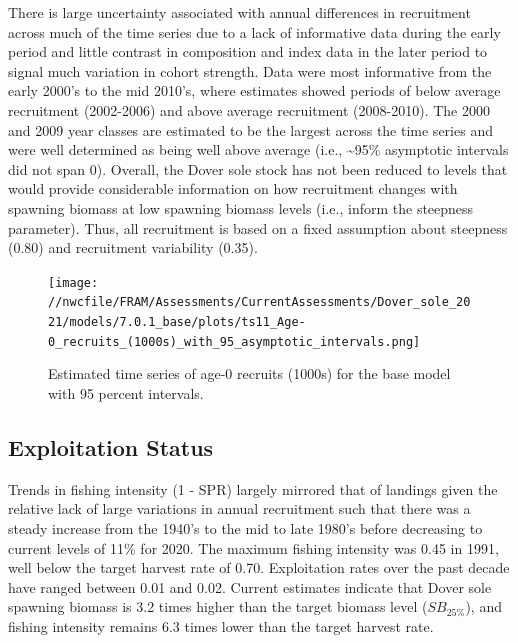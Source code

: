 \documentclass[11pt,
  english,
  a4paper,
]{article}
\begin{document}
There is large uncertainty associated with annual differences in recruitment across much of the time series due to a lack of informative data during the early period and little contrast in composition and index data in the later period to signal much variation in cohort strength. Data were most informative from the early 2000's to the mid 2010's, where estimates showed periods of below average recruitment (2002-2006) and above average recruitment (2008-2010). The 2000 and 2009 year classes are estimated to be the largest across the time series and were well determined as being well above average (i.e., \textasciitilde95\% asymptotic intervals did not span 0). Overall, the Dover sole stock has not been reduced to levels that would provide considerable information on how recruitment changes with spawning biomass at low spawning biomass levels (i.e., inform the steepness parameter). Thus, all recruitment is based on a fixed assumption about steepness (0.80) and recruitment variability (0.35).

\leavevmode\tagmcend\tagstructend\par




\begin{figure}
\centering
\texttt{[image: //nwcfile/FRAM/Assessments/CurrentAssessments/Dover\_sole\_2021/models/7.0.1\_base/plots/ts11\_Age-0\_recruits\_(1000s)\_with\_95\_asymptotic\_intervals.png]}
\caption{Estimated time series of age-0 recruits (1000s) for the base model with 95 percent intervals.\label{fig:es-recruits}}
\end{figure}

\tagmcend\tagstructend


\hypertarget{exploitation-status}{%
\subsection*{Exploitation Status}\label{exploitation-status}}

\leavevmode\tagmcend\tagstructend


Trends in fishing intensity (1 - SPR) largely mirrored that of landings given the relative lack of large variations in annual recruitment such that there was a steady increase from the 1940's to the mid to late 1980's before decreasing to current levels of 11\% for 2020. The maximum fishing intensity was 0.45 in 1991, well below the target harvest rate of 0.70. Exploitation rates over the past decade have ranged between 0.01 and 0.02. Current estimates indicate that Dover sole spawning biomass is 3.2 times higher than the target biomass level ({\(SB_{25\%}\)\leavevmode\tagmcend\tagstructend}), and fishing intensity remains 6.3 times lower than the target harvest rate.
\end{document}
